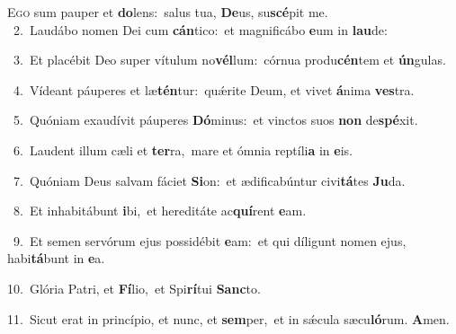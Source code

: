 \lettrine{\initial\textcolor{\initialcolor}{E}}{go} sum pauper et \textbf{do}\-lens:~\star salus tua, \textbf{De}\-us, su\-\textbf{scé}\-pit me.\\
{\numbfont\textcolor{\numbcolor}{~2.}}~Laudábo nomen Dei cum \textbf{cán}\-tico:~\star et magnificábo \textbf{e}\-um in \textbf{lau}\-de:\par
{\numbfont\textcolor{\numbcolor}{~3.}}~Et placébit Deo super vítulum no\-\textbf{vél}\-lum:~\star córnua produ\-\textbf{cén}\-tem et \textbf{ún}\-gulas.\par
{\numbfont\textcolor{\numbcolor}{~4.}}~Vídeant páuperes et læ\-\textbf{tén}\-tur:~\star quǽrite Deum, et vivet \textbf{á}\-nima \textbf{ves}\-tra.\par
{\numbfont\textcolor{\numbcolor}{~5.}}~Quóniam exaudívit páuperes \textbf{Dó}\-minus:~\star et vinctos suos \textbf{non} de\-\textbf{spé}\-xit.\par
{\numbfont\textcolor{\numbcolor}{~6.}}~Laudent illum cæli et \textbf{ter}\-ra,~\star mare et ómnia reptíli\textbf{a} in \textbf{e}\-is.\par
{\numbfont\textcolor{\numbcolor}{~7.}}~Quóniam Deus salvam fáciet \textbf{Si}\-on:~\star et ædificabúntur civi\-\textbf{tá}\-tes \textbf{Ju}\-da.\par
{\numbfont\textcolor{\numbcolor}{~8.}}~Et inhabitábunt \textbf{i}\-bi,~\star et hereditáte ac\-\textbf{quí}\-rent \textbf{e}\-am.\par
{\numbfont\textcolor{\numbcolor}{~9.}}~Et semen servórum ejus possidébit \textbf{e}\-am:~\star et qui díligunt nomen ejus, habi\-\textbf{tá}\-bunt in \textbf{e}\-a.\par
{\numbfont\textcolor{\numbcolor}{10.}}~Glória Patri, et \textbf{Fí}\-lio,~\star et Spi\-\textbf{rí}\-tui \textbf{Sanc}\-to.\par
{\numbfont\textcolor{\numbcolor}{11.}}~Sicut erat in princípio, et nunc, et \textbf{sem}\-per,~\star et in sǽcula sæcu\-\textbf{ló}\-rum. \textbf{A}\-men.\par
